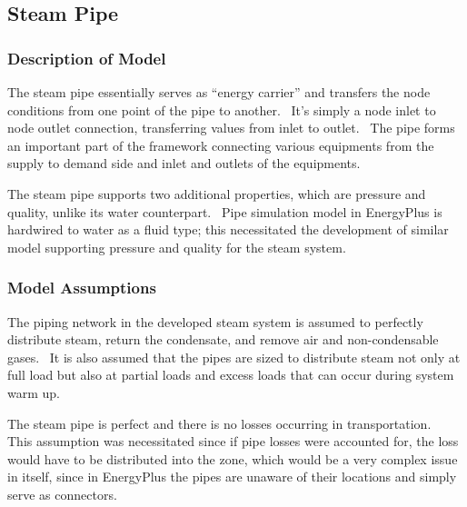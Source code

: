 \subsection{Steam Pipe}\label{steam-pipe}

\subsubsection{Description of Model}\label{description-of-model-1}

The steam pipe essentially serves as ``energy carrier'' and transfers the node conditions from one point of the pipe to another.~ It's simply a node inlet to node outlet connection, transferring values from inlet to outlet.~ The pipe forms an important part of the framework connecting various equipments from the supply to demand side and inlet and outlets of the equipments.

The steam pipe supports two additional properties, which are pressure and quality, unlike its water counterpart.~ Pipe simulation model in EnergyPlus is hardwired to water as a fluid type; this necessitated the development of similar model supporting pressure and quality for the steam system.

\subsubsection{Model Assumptions}\label{model-assumptions-2}

The piping network in the developed steam system is assumed to perfectly distribute steam, return the condensate, and remove air and non-condensable gases.~ It is also assumed that the pipes are sized to distribute steam not only at full load but also at partial loads and excess loads that can occur during system warm up.

The steam pipe is perfect and there is no losses occurring in transportation.~ This assumption was necessitated since if pipe losses were accounted for, the loss would have to be distributed into the zone, which would be a very complex issue in itself, since in EnergyPlus the pipes are unaware of their locations and simply serve as connectors.
